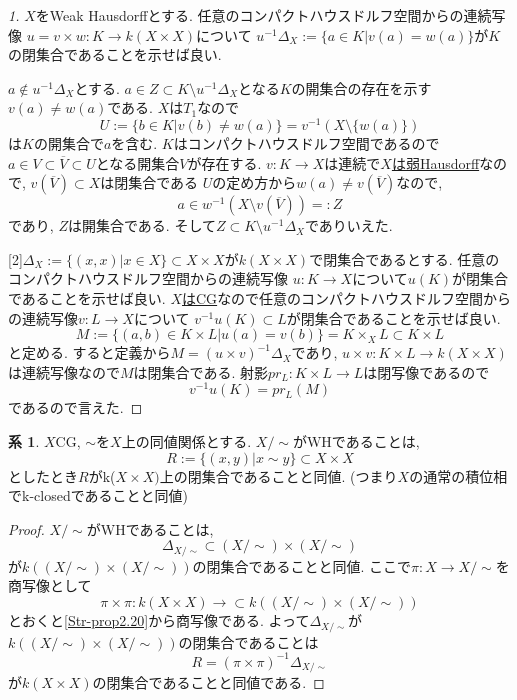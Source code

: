 \documentclass[dvipdfmx,a4paper,11pt]{article}
\theoremstyle{definition}
\newtheorem{cor}[thm]{系}
\begin{document}
\begin{proof}
[1]$X$をWeak Hausdorffとする. 
任意のコンパクトハウスドルフ空間からの連続写像
$u = v \times w : K \to k(X \times X)$について
$u^{-1}\Delta_X := \{a \in K | v(a)=w(a) \}$が$K$の閉集合であることを示せば良い.

$a \not \in u^{-1}\Delta_X$とする.
$a \in Z \subset  K \setminus u^{-1}\Delta_X$となる$K$の開集合の存在を示す
$v(a) \neq w(a)$である. $X$は$T_1$なので
$$
U:= \{ b \in K | v(b) \neq w(a) \} = v^{-1}(X \setminus \{w(a)\})
$$
は$K$の開集合で$a$を含む.
$K$はコンパクトハウスドルフ空間であるので
$a \in V \subset \overline{V} \subset U$となる開集合$V$が存在する.
$v : K \to X$は連続で\underline{$X$は弱Hausdorff}なので, $v(\overline{V}) \subset X$は閉集合である
$U$の定め方から$w(a) \neq v(\overline{V})$なので, 
$$
a \in w^{-1}( X \setminus v(\overline{V}) ) =: Z
$$
であり,  $Z$は開集合である. 
そして$Z\subset K \setminus u^{-1}\Delta_X$でありいえた.

[2]$\Delta_X := \{ (x,x)| x \in X\}\subset X \times X$が$k(X \times X)$で閉集合であるとする. 
任意のコンパクトハウスドルフ空間からの連続写像
$u : K \to X$について$u(K)$が閉集合であることを示せば良い.
\underline{$X$はCG}なので任意のコンパクトハウスドルフ空間からの連続写像$v : L \to X$について
$v^{-1}u(K) \subset L$が閉集合であることを示せば良い.
$$
M := \{ (a,b) \in K \times L | u(a) =v(b)\}=K\times_{X}L \subset K \times L
$$
と定める. 
すると定義から$M = (u \times v)^{-1}\Delta_{X}$であり, 
$u \times v : K \times L \to k(X \times X)$は連続写像なので$M$は閉集合である. 
射影$pr_{L} : K \times L \to L$は閉写像であるので
$$
v^{-1}u(K) = pr_{L}(M)
$$
であるので言えた. 
\end{proof}


\begin{cor}\cite[Cor2.21]{Str}
\label{Str-cor2.21}
$X$CG, $\sim$を$X$上の同値関係とする. 
$X/\sim $がWHであることは, 
$$
R:= \{ (x,y)| x \sim y\} \subset X \times X
$$
としたとき$R$がk($X \times X)$上の閉集合であることと同値.
(つまり$X$の通常の積位相でk-closedであることと同値)
\end{cor}
\begin{proof}
$X/\sim $がWHであることは,
$$
\Delta_{X/\sim} \subset (X/\sim) \times (X/\sim)
$$
が$k((X/\sim) \times (X/\sim))$の閉集合であることと同値.
ここで$\pi : X \to X/\sim$を商写像として
$$
\pi \times \pi : k(X \times X) \to \subset k((X/\sim) \times (X/\sim))
$$
とおくと\ref{Str-prop2.20}から商写像である.
よって$\Delta_{X/\sim} $が$k((X/\sim) \times (X/\sim))$の閉集合であることは
$$
R = (\pi \times \pi )^{-1}\Delta_{X/\sim} 
$$
が$ k(X \times X)$の閉集合であることと同値である.
\end{proof}
\end{document}
